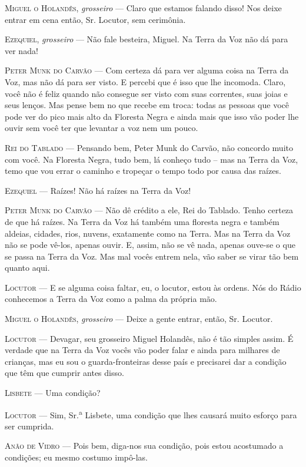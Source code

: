 \begin{myparindent}{0pt}
\begin{Parskip}
\textsc{Miguel o Holandês}, \emph{grosseiro} --- Claro que estamos falando disso!
Nos deixe entrar em cena então, Sr. Locutor, sem cerimônia.

\textsc{Ezequiel}, \emph{grosseiro} --- Não fale besteira, Miguel. Na Terra da Voz
não dá para ver nada!

\textsc{Peter Munk do Carvão} --- Com certeza dá para ver alguma coisa na Terra da
Voz, mas não dá para ser visto. E percebi que é isso que lhe incomoda.
Claro, você não é feliz quando não consegue ser visto com suas
correntes, suas joias e seus lenços. Mas pense bem no que recebe em
troca: todas as pessoas que você pode ver do pico mais alto da Floresta
Negra e ainda mais que isso vão poder lhe ouvir sem você ter que
levantar a voz nem um pouco.

\textsc{Rei do Tablado} --- Pensando bem, Peter Munk do Carvão, não concordo muito
com você. Na Floresta Negra, tudo bem, lá conheço tudo -- mas na Terra
da Voz, temo que vou errar o caminho e tropeçar o tempo todo por causa
das raízes.

\textsc{Ezequiel} --- Raízes! Não há raízes na Terra da Voz!

\textsc{Peter Munk do Carvão} --- Não dê crédito a ele, Rei do Tablado. Tenho
certeza de que há raízes. Na Terra da Voz há também uma floresta negra e
também aldeias, cidades, rios, nuvens, exatamente como na Terra. Mas na
Terra da Voz não se pode vê-los, apenas ouvir. E, assim, não se vê nada,
apenas ouve-se o que se passa na Terra da Voz. Mas mal vocês entrem
nela, vão saber se virar tão bem quanto aqui.

\textsc{Locutor} --- E se alguma coisa faltar, eu, o locutor, estou às ordens. Nós
do Rádio conhecemos a Terra da Voz como a palma da própria mão.

\textsc{Miguel o Holandês}, \emph{grosseiro} --- Deixe a gente entrar, então, Sr.
Locutor.

\textsc{Locutor} --- Devagar, seu grosseiro Miguel Holandês, não é tão simples
assim. É verdade que na Terra da Voz vocês vão poder falar e ainda para
milhares de crianças, mas eu sou o guarda-fronteiras desse país e
precisarei dar a condição que têm que cumprir antes disso.

\textsc{Lisbete} --- Uma condição?

\textsc{Locutor} --- Sim, Sr.\textsuperscript{a} Lisbete, uma condição que lhes
causará muito esforço para ser cumprida.

\textsc{Anão de Vidro} --- Pois bem, diga-nos sua condição, pois estou acostumado
a condições; eu mesmo costumo impô-las.


\end{Parskip}
\end{myparindent}
